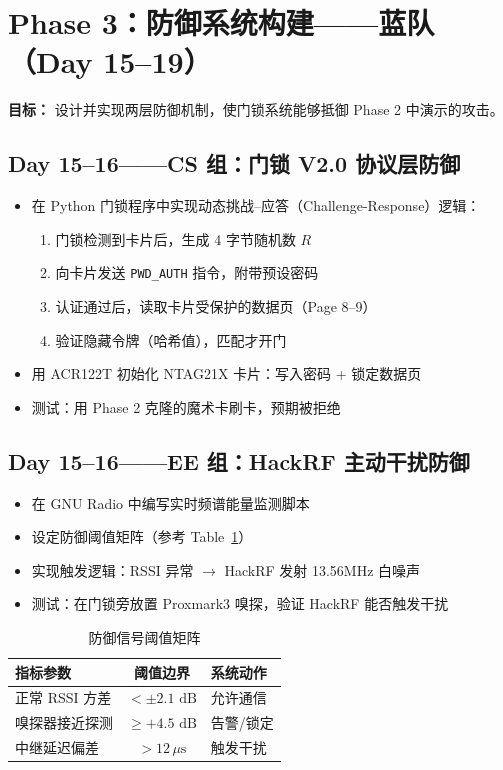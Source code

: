 \documentclass[12pt,a4paper]{ctexart}
\begin{document}
\section{Phase 3：防御系统构建——蓝队（Day 15--19）}

\textbf{目标：} 设计并实现两层防御机制，使门锁系统能够抵御 Phase 2 中演示的攻击。

\subsection*{Day 15--16——CS 组：门锁 V2.0 协议层防御}
\begin{itemize}[nosep]
    \item 在 Python 门锁程序中实现动态挑战--应答（Challenge-Response）逻辑：
    \begin{enumerate}[nosep,label=步骤\arabic*:]
        \item 门锁检测到卡片后，生成 4 字节随机数 $R$
        \item 向卡片发送 \texttt{PWD\_AUTH} 指令，附带预设密码
        \item 认证通过后，读取卡片受保护的数据页（Page 8--9）
        \item 验证隐藏令牌（哈希值），匹配才开门
    \end{enumerate}
    \item 用 ACR122T 初始化 NTAG21X 卡片：写入密码 + 锁定数据页
    \item 测试：用 Phase 2 克隆的魔术卡刷卡，预期被拒绝
\end{itemize}

\subsection*{Day 15--16——EE 组：HackRF 主动干扰防御}
\begin{itemize}[nosep]
    \item 在 GNU Radio 中编写实时频谱能量监测脚本
    \item 设定防御阈值矩阵（参考 Table~\ref{tab:defense_metrics}）
    \item 实现触发逻辑：RSSI 异常 $\to$ HackRF 发射 13.56MHz 白噪声
    \item 测试：在门锁旁放置 Proxmark3 嗅探，验证 HackRF 能否触发干扰
\end{itemize}

\begin{table}[h]
\centering
\caption{防御信号阈值矩阵}
\label{tab:defense_metrics}
\begin{tabular}{lcl}
\toprule
\textbf{指标参数} & \textbf{阈值边界} & \textbf{系统动作} \\
\midrule
正常 RSSI 方差 & $< \pm 2.1\text{ dB}$ & 允许通信 \\
嗅探器接近探测 & $\ge +4.5\text{ dB}$ & 告警/锁定 \\
中继延迟偏差 & $> 12\,\mu\text{s}$ & 触发干扰 \\
\bottomrule
\end{tabular}
\end{table}
\end{document}
